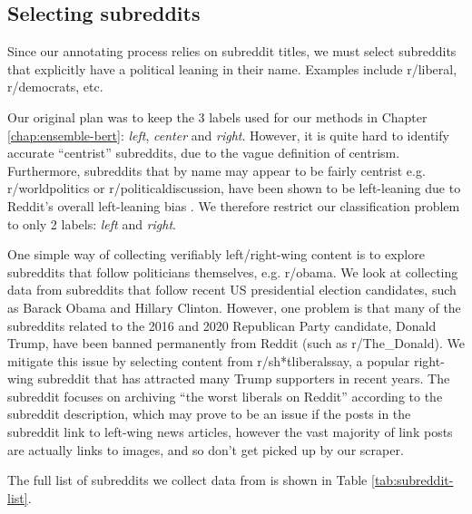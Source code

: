 \subsection{Selecting subreddits} \label{subsec:selecting-subreddits}

Since our annotating process relies on subreddit titles, we must select subreddits that explicitly have a political leaning in their name. Examples include r/liberal, r/democrats, etc.

Our original plan was to keep the 3 labels used for our methods in Chapter \ref{chap:ensemble-bert}: \textit{left}, \textit{center} and \textit{right}. However, it is quite hard to identify accurate ``centrist'' subreddits, due to the vague definition of centrism. Furthermore, subreddits that by name may appear to be fairly centrist e.g. r/worldpolitics or r/politicaldiscussion, have been shown to be left-leaning due to Reddit's overall left-leaning bias \cite{tyler}. We therefore restrict our classification problem to only 2 labels: \textit{left} and \textit{right}.

One simple way of collecting verifiably left/right-wing content is to explore subreddits that follow politicians themselves, e.g. r/obama. We look at collecting data from subreddits that follow recent US presidential election candidates, such as Barack Obama and Hillary Clinton. However, one problem is that many of the subreddits related to the 2016 and 2020 Republican Party candidate, Donald Trump, have been banned permanently from Reddit (such as r/The\_Donald). We mitigate this issue by selecting content from r/sh*tliberalssay, a popular right-wing subreddit that has attracted many Trump supporters in recent years. The subreddit focuses on archiving ``the worst liberals on Reddit'' according to the subreddit description, which may prove to be an issue if the posts in the subreddit link to left-wing news articles, however the vast majority of link posts are actually links to images, and so don't get picked up by our scraper.

The full list of subreddits we collect data from is shown in Table \ref{tab:subreddit-list}.

